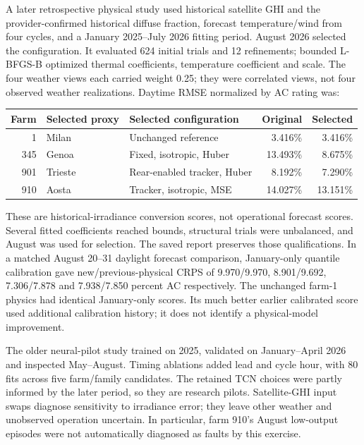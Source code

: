 A later retrospective physical study used historical satellite GHI and the
provider-confirmed historical diffuse fraction, forecast temperature/wind from
four cycles, and a January 2025--July 2026 fitting period. August 2026 selected
the configuration. It evaluated 624 initial trials and 12 refinements; bounded
L-BFGS-B optimized thermal coefficients, temperature coefficient and scale.
The four weather views each carried weight 0.25; they were correlated views,
not four observed weather realizations. Daytime RMSE normalized by AC rating was:
\begin{center}\small
\begin{tabular}{rllrr}
\toprule Farm & Selected proxy & Selected configuration & Original & Selected\\\midrule
1 & Milan & Unchanged reference & 3.416\% & 3.416\%\\
345 & Genoa & Fixed, isotropic, Huber & 13.493\% & 8.675\%\\
901 & Trieste & Rear-enabled tracker, Huber & 8.192\% & 7.290\%\\
910 & Aosta & Tracker, isotropic, MSE & 14.027\% & 13.151\%\\
\bottomrule\end{tabular}\end{center}
These are historical-irradiance conversion scores, not operational forecast
scores. Several fitted coefficients reached bounds, structural trials were
unbalanced, and August was used for selection. The saved report
 preserves those
qualifications. In a matched August 20--31 daylight forecast comparison,
January-only quantile calibration gave new/previous-physical CRPS of
9.970/9.970, 8.901/9.692, 7.306/7.878 and 7.938/7.850 percent AC respectively.
The unchanged farm-1 physics had identical January-only scores. Its much better
earlier calibrated score used additional calibration history; it does not
identify a physical-model improvement.

The older neural-pilot study trained on 2025, validated on January--April 2026
and inspected May--August. Timing ablations added lead and cycle hour, with
80 fits across five farm/family candidates. The retained TCN choices were partly
informed by the later period, so they are research pilots. Satellite-GHI input
swaps diagnose sensitivity to irradiance error; they leave other weather and
unobserved operation uncertain. In particular, farm 910's August low-output
episodes were not automatically diagnosed as faults by this exercise.

